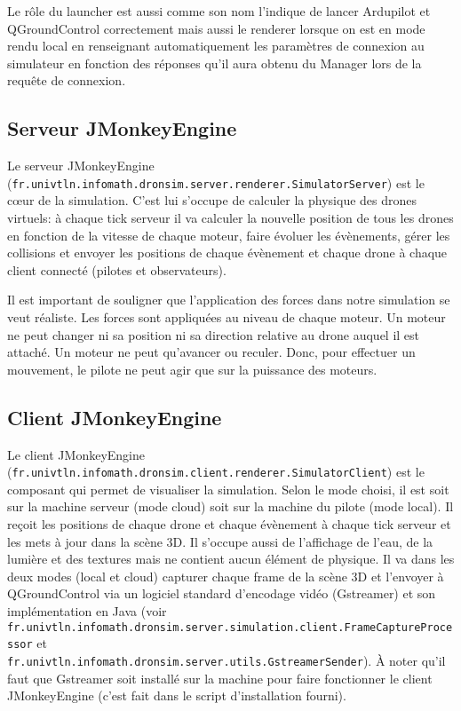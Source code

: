 \documentclass{scrartcl}
\begin{document}
Le rôle du launcher est aussi comme son nom l'indique de lancer Ardupilot et QGroundControl correctement mais aussi le renderer lorsque
on est en mode rendu local en renseignant automatiquement les paramètres de connexion au simulateur en fonction des réponses qu'il aura obtenu du Manager
lors de la requête de connexion.

\subsection{Serveur JMonkeyEngine}
Le serveur JMonkeyEngine (\texttt{fr.univtln.infomath.dronsim.server.renderer.SimulatorServer}) est le cœur de la simulation.
C'est lui s'occupe de calculer la physique des drones virtuels: à chaque tick serveur il va calculer la nouvelle position de tous les drones en fonction
de la vitesse de chaque moteur, faire évoluer les évènements, gérer les collisions et envoyer les positions de chaque évènement et chaque drone à chaque client connecté
(pilotes et observateurs).

Il est important de souligner que l’application des forces dans notre simulation se veut réaliste.
Les forces sont appliquées au niveau de chaque moteur.
Un moteur ne peut changer ni sa position ni sa direction relative au drone auquel il est attaché.
Un moteur ne peut qu'avancer ou reculer.
Donc, pour effectuer un mouvement, le pilote ne peut agir que sur la puissance des moteurs.

\subsection{Client JMonkeyEngine}
Le client JMonkeyEngine (\texttt{fr.univtln.infomath.dronsim.client.renderer.SimulatorClient}) est le composant qui permet de visualiser la simulation. Selon le mode choisi,
il est soit sur la machine serveur (mode cloud) soit sur la machine du pilote (mode local). Il reçoit les positions de chaque drone et chaque évènement à chaque tick serveur
et les mets à jour dans la scène 3D. Il s'occupe aussi de l'affichage de l'eau, de la lumière et des textures mais ne contient aucun élément de physique.
Il va dans les deux modes (local et cloud) capturer chaque frame de la scène 3D et l'envoyer à QGroundControl via un logiciel standard d'encodage vidéo
(Gstreamer) et son implémentation en Java (voir \texttt{fr.univtln.infomath.dronsim.server.simulation.client.FrameCaptureProcessor} et\\
\texttt{fr.univtln.infomath.dronsim.server.utils.GstreamerSender}). À noter qu'il faut que Gstreamer soit installé sur la machine pour
faire fonctionner le client JMonkeyEngine (c'est fait dans le script d'installation fourni).
\end{document}
